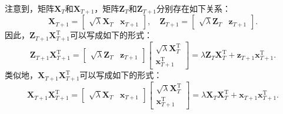 注意到，矩阵\( \mathbf{X}_T \)和\( \mathbf{X}_{T+1} \)，矩阵\( \mathbf{Z}_T \)和\( \mathbf{Z}_{T+1} \)分别存在如下关系：
\[
    \mathbf{X}_{T+1} = \begin{bmatrix} \sqrt{\lambda} \mathbf{X}_T & \bm{x}_{T+1} \end{bmatrix}, \quad  \mathbf{Z}_{T+1} = \begin{bmatrix} \sqrt{\lambda} \mathbf{Z}_T & \bm{z}_{T+1} \end{bmatrix}.
\]
因此，\( \mathbf{Z}_{T+1} \mathbf{X}_{T+1}^\mathrm{T} \)可以写成如下的形式：
\[
    \mathbf{Z}_{T+1} \mathbf{X}_{T+1}^\mathrm{T} = \begin{bmatrix} \sqrt{\lambda} \mathbf{Z}_T & \bm{z}_{T+1} \end{bmatrix} \begin{bmatrix}
        \sqrt{\lambda} \mathbf{X}_T^\mathrm{T} \\
        \bm{x}_{T+1}^\mathrm{T}
    \end{bmatrix} = \lambda \mathbf{Z}_T \mathbf{X}_T^\mathrm{T} + \bm{z}_{T+1}\bm{x}_{T+1}^\mathrm{T}.
\]
类似地，\( \mathbf{X}_{T+1}  \mathbf{X}_{T+1}^\mathrm{T} \)可以写成如下的形式：
\[
    \mathbf{X}_{T+1}  \mathbf{X}_{T+1}^\mathrm{T} = \begin{bmatrix} \sqrt{\lambda} \mathbf{X}_T & \bm{x}_{T+1} \end{bmatrix} \begin{bmatrix}
        \sqrt{\lambda} \mathbf{X}_T^\mathrm{T} \\
        \bm{x}_{T+1}^\mathrm{T}
    \end{bmatrix} = \lambda \mathbf{X}_T \mathbf{X}_T^\mathrm{T} + \bm{x}_{T+1}\bm{x}_{T+1}^\mathrm{T}.
\]

